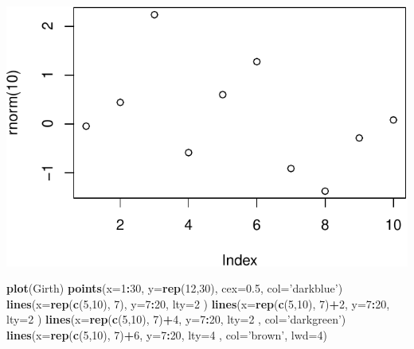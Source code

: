 \documentclass[]{book}
\newenvironment{Shaded}{\begin{snugshade}}{\end{snugshade}}
\newcommand{\DataTypeTok}[1]{\textcolor[rgb]{0.13,0.29,0.53}{#1}}
\newcommand{\DecValTok}[1]{\textcolor[rgb]{0.00,0.00,0.81}{#1}}
\newcommand{\FloatTok}[1]{\textcolor[rgb]{0.00,0.00,0.81}{#1}}
\newcommand{\KeywordTok}[1]{\textcolor[rgb]{0.13,0.29,0.53}{\textbf{#1}}}
\newcommand{\NormalTok}[1]{#1}
\newcommand{\OperatorTok}[1]{\textcolor[rgb]{0.81,0.36,0.00}{\textbf{#1}}}
\newcommand{\StringTok}[1]{\textcolor[rgb]{0.31,0.60,0.02}{#1}}
\theoremstyle{definition}
\theoremstyle{definition}
\theoremstyle{definition}
\theoremstyle{remark}
\begin{document}
\includegraphics[width=0.5\linewidth]{Rcourse_files/figure-latex/unnamed-chunk-250-1}

\begin{Shaded}
\begin{Highlighting}[]
\KeywordTok{plot}\NormalTok{(Girth)}
\KeywordTok{points}\NormalTok{(}\DataTypeTok{x=}\DecValTok{1}\OperatorTok{:}\DecValTok{30}\NormalTok{, }\DataTypeTok{y=}\KeywordTok{rep}\NormalTok{(}\DecValTok{12}\NormalTok{,}\DecValTok{30}\NormalTok{), }\DataTypeTok{cex=}\FloatTok{0.5}\NormalTok{, }\DataTypeTok{col=}\StringTok{'darkblue'}\NormalTok{)}
\KeywordTok{lines}\NormalTok{(}\DataTypeTok{x=}\KeywordTok{rep}\NormalTok{(}\KeywordTok{c}\NormalTok{(}\DecValTok{5}\NormalTok{,}\DecValTok{10}\NormalTok{), }\DecValTok{7}\NormalTok{), }\DataTypeTok{y=}\DecValTok{7}\OperatorTok{:}\DecValTok{20}\NormalTok{, }\DataTypeTok{lty=}\DecValTok{2}\NormalTok{ )}
\KeywordTok{lines}\NormalTok{(}\DataTypeTok{x=}\KeywordTok{rep}\NormalTok{(}\KeywordTok{c}\NormalTok{(}\DecValTok{5}\NormalTok{,}\DecValTok{10}\NormalTok{), }\DecValTok{7}\NormalTok{)}\OperatorTok{+}\DecValTok{2}\NormalTok{, }\DataTypeTok{y=}\DecValTok{7}\OperatorTok{:}\DecValTok{20}\NormalTok{, }\DataTypeTok{lty=}\DecValTok{2}\NormalTok{ )}
\KeywordTok{lines}\NormalTok{(}\DataTypeTok{x=}\KeywordTok{rep}\NormalTok{(}\KeywordTok{c}\NormalTok{(}\DecValTok{5}\NormalTok{,}\DecValTok{10}\NormalTok{), }\DecValTok{7}\NormalTok{)}\OperatorTok{+}\DecValTok{4}\NormalTok{, }\DataTypeTok{y=}\DecValTok{7}\OperatorTok{:}\DecValTok{20}\NormalTok{, }\DataTypeTok{lty=}\DecValTok{2}\NormalTok{ , }\DataTypeTok{col=}\StringTok{'darkgreen'}\NormalTok{)}
\KeywordTok{lines}\NormalTok{(}\DataTypeTok{x=}\KeywordTok{rep}\NormalTok{(}\KeywordTok{c}\NormalTok{(}\DecValTok{5}\NormalTok{,}\DecValTok{10}\NormalTok{), }\DecValTok{7}\NormalTok{)}\OperatorTok{+}\DecValTok{6}\NormalTok{, }\DataTypeTok{y=}\DecValTok{7}\OperatorTok{:}\DecValTok{20}\NormalTok{, }\DataTypeTok{lty=}\DecValTok{4}\NormalTok{ , }\DataTypeTok{col=}\StringTok{'brown'}\NormalTok{, }\DataTypeTok{lwd=}\DecValTok{4}\NormalTok{)}
\end{Highlighting}
\end{Shaded}
\end{document}

